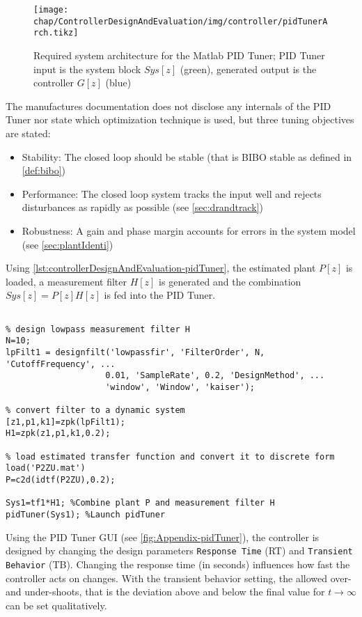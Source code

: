 \begin{figure}[tb]
	\centering
	\texttt{[image: chap/ControllerDesignAndEvaluation/img/controller/pidTunerArch.tikz]}
	\caption{Required system architecture for the Matlab PID Tuner; PID Tuner input is the system block $Sys[z]$ (green), generated output is the controller $G[z]$ (blue)}
	\label{fig:controllerDesignAndEvaluation-pidTunersys}
\end{figure}

The manufactures documentation \cite{pidTuner} does not disclose any internals of the PID Tuner nor state which optimization technique is used, but three tuning objectives are stated:
\begin{itemize}
\item Stability: The closed loop should be stable (that is BIBO stable as defined in \autoref{def:bibo})
\item Performance: The closed loop system tracks the input well and rejects disturbances as rapidly as possible (see \autoref{sec:drandtrack})
\item Robustness: A gain and phase margin accounts for errors in the system model (see \autoref{sec:plantIdenti})
\end{itemize}

Using \autoref{lst:controllerDesignAndEvaluation-pidTuner}, the estimated plant $P[z]$ is loaded, a measurement filter $H[z]$ is generated and the combination $Sys[z]=P[z]H[z]$ is fed into the PID Tuner.

\begin{lstlisting}[style=matlab,caption = Matlab script to generate an input system for PID Tuner, label = lst:controllerDesignAndEvaluation-pidTuner]

% design lowpass measurement filter H
N=10;
lpFilt1 = designfilt('lowpassfir', 'FilterOrder', N, 'CutoffFrequency', ...
                    0.01, 'SampleRate', 0.2, 'DesignMethod', ...
                    'window', 'Window', 'kaiser');

% convert filter to a dynamic system                
[z1,p1,k1]=zpk(lpFilt1);
H1=zpk(z1,p1,k1,0.2);

% load estimated transfer function and convert it to discrete form
load('P2ZU.mat')
P=c2d(idtf(P2ZU),0.2);

Sys1=tf1*H1; %Combine plant P and measurement filter H
pidTuner(Sys1); %Launch pidTuner
\end{lstlisting}

Using the PID Tuner GUI (see \autoref{fig:Appendix-pidTuner}), the controller is designed by changing the design parameters \texttt{Response Time} (RT) and \texttt{Transient Behavior} (TB). Changing the response time (in seconds) influences how fast the controller acts on changes. With the transient behavior setting, the allowed over- and under-shoots, that is the deviation above and below the final value for $t \rightarrow \infty$ can be set qualitatively.

